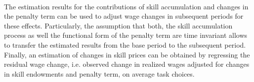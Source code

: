 \documentclass[../main.tex]{subfiles}
\begin{document}
\\
The estimation results for the contributions of skill accumulation and changes in the penalty term can be used to adjust wage changes in subsequent periods for these effects. Particularly, the assumption that both, the skill accumulation process as well the functional form of the penalty term are time invariant allows to transfer the estimated results from the base period to the subsequent period. Finally, an estimation of changes in skill prices can be obtained by regressing the residual wage change, i.e. observed change in realized wages adjusted for changes in skill endowments and penalty term, on average task choices.
\end{document}
